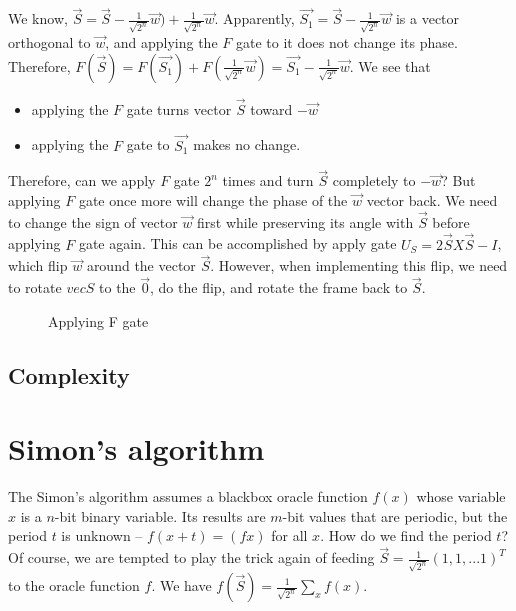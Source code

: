 \documentclass[oneside, letter, 12pt]{book}
\begin{document}
We know, $\vec{S} = \vec{S} - \frac 1 {\sqrt{2^n}} \vec{w}) + \frac 1  {\sqrt{2^n}} \vec{w}$. Apparently, $\vec{S_1}  = \vec{S} - \frac 1 {\sqrt{2^n}} \vec{w}$ is a vector orthogonal to $\vec{w}$, and applying the $F$ gate to it does not change its phase. Therefore, $F(\vec{S}) = F(\vec{S_1}) + F(\frac 1  {\sqrt{2^n}} \vec{w})  = \vec{S_1} - \frac 1 {\sqrt{2^n}} \vec{w}$. We see that 
\begin{itemize}
    \item applying the $F$ gate turns vector $\vec{S}$ toward $-\vec{w}$
    \item applying the $F$ gate to $\vec{S_1}$ makes no change.
\end{itemize}
Therefore, can we apply $F$ gate $2^n$ times and turn $\vec{S}$ completely to $-\vec{w}$? But applying $F$ gate once more will change the phase of the $\vec{w}$ vector back. We need to change the sign of vector $\vec{w}$ first while preserving its angle with $\vec{S}$ before applying $F$ gate again. This can be accomplished by apply gate $U_S = 2 \vec{S}X\vec{S} -I$, which flip $\vec{w}$ around the vector $\vec{S}$. However, when implementing this flip, we need to rotate $vec{S}$ to the $\vec{0}$, do the flip, and rotate the frame back to $\vec{S}$.

\begin{figure}[h]\label{Grover}

\caption{Applying F gate}
\end{figure}

\subsection{Complexity}

\section{Simon's algorithm}
The Simon's algorithm assumes a blackbox oracle function $f(x)$ whose variable $x$ is a $n$-bit binary variable. Its results are $m$-bit values that are periodic, but the period $t$ is unknown -- $f(x+t)=(fx)$ for all $x$. How do we find the period $t$? Of course, we are tempted to play the trick again of feeding $\vec{S} = \frac 1 {\sqrt{2^n}} (1, 1, ...1)^T$ to the oracle function $f$. We have
$f(\vec{S}) = \frac 1  {\sqrt{2^n}} \sum_x f(x)$.
\end{document}
